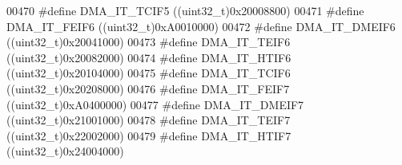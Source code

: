 \begin{DoxyCode}
00470 \textcolor{preprocessor}{#}\textcolor{preprocessor}{define} \textcolor{preprocessor}{DMA\_IT\_TCIF5}                      \textcolor{preprocessor}{(}\textcolor{preprocessor}{(}\textcolor{preprocessor}{uint32\_t}\textcolor{preprocessor}{)}0x20008800\textcolor{preprocessor}{)}
00471 \textcolor{preprocessor}{#}\textcolor{preprocessor}{define} \textcolor{preprocessor}{DMA\_IT\_FEIF6}                      \textcolor{preprocessor}{(}\textcolor{preprocessor}{(}\textcolor{preprocessor}{uint32\_t}\textcolor{preprocessor}{)}0xA0010000\textcolor{preprocessor}{)}
00472 \textcolor{preprocessor}{#}\textcolor{preprocessor}{define} \textcolor{preprocessor}{DMA\_IT\_DMEIF6}                     \textcolor{preprocessor}{(}\textcolor{preprocessor}{(}\textcolor{preprocessor}{uint32\_t}\textcolor{preprocessor}{)}0x20041000\textcolor{preprocessor}{)}
00473 \textcolor{preprocessor}{#}\textcolor{preprocessor}{define} \textcolor{preprocessor}{DMA\_IT\_TEIF6}                      \textcolor{preprocessor}{(}\textcolor{preprocessor}{(}\textcolor{preprocessor}{uint32\_t}\textcolor{preprocessor}{)}0x20082000\textcolor{preprocessor}{)}
00474 \textcolor{preprocessor}{#}\textcolor{preprocessor}{define} \textcolor{preprocessor}{DMA\_IT\_HTIF6}                      \textcolor{preprocessor}{(}\textcolor{preprocessor}{(}\textcolor{preprocessor}{uint32\_t}\textcolor{preprocessor}{)}0x20104000\textcolor{preprocessor}{)}
00475 \textcolor{preprocessor}{#}\textcolor{preprocessor}{define} \textcolor{preprocessor}{DMA\_IT\_TCIF6}                      \textcolor{preprocessor}{(}\textcolor{preprocessor}{(}\textcolor{preprocessor}{uint32\_t}\textcolor{preprocessor}{)}0x20208000\textcolor{preprocessor}{)}
00476 \textcolor{preprocessor}{#}\textcolor{preprocessor}{define} \textcolor{preprocessor}{DMA\_IT\_FEIF7}                      \textcolor{preprocessor}{(}\textcolor{preprocessor}{(}\textcolor{preprocessor}{uint32\_t}\textcolor{preprocessor}{)}0xA0400000\textcolor{preprocessor}{)}
00477 \textcolor{preprocessor}{#}\textcolor{preprocessor}{define} \textcolor{preprocessor}{DMA\_IT\_DMEIF7}                     \textcolor{preprocessor}{(}\textcolor{preprocessor}{(}\textcolor{preprocessor}{uint32\_t}\textcolor{preprocessor}{)}0x21001000\textcolor{preprocessor}{)}
00478 \textcolor{preprocessor}{#}\textcolor{preprocessor}{define} \textcolor{preprocessor}{DMA\_IT\_TEIF7}                      \textcolor{preprocessor}{(}\textcolor{preprocessor}{(}\textcolor{preprocessor}{uint32\_t}\textcolor{preprocessor}{)}0x22002000\textcolor{preprocessor}{)}
00479 \textcolor{preprocessor}{#}\textcolor{preprocessor}{define} \textcolor{preprocessor}{DMA\_IT\_HTIF7}                      \textcolor{preprocessor}{(}\textcolor{preprocessor}{(}\textcolor{preprocessor}{uint32\_t}\textcolor{preprocessor}{)}0x24004000\textcolor{preprocessor}{)}

\end{DoxyCode}
